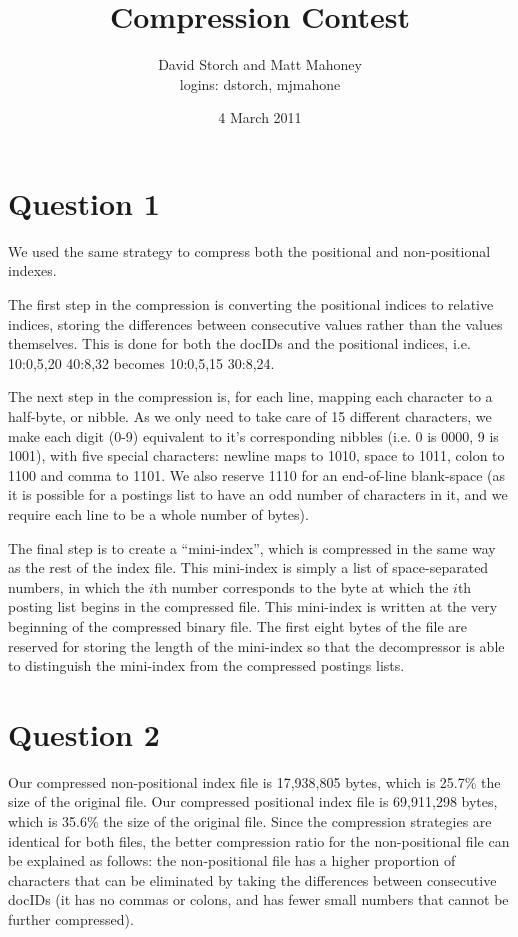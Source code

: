 \documentclass[11pt]{article}
\title{Compression Contest}
\author{David Storch and Matt Mahoney \\
	logins: dstorch, mjmahone}
\date{4 March 2011}
\begin{document}
\maketitle

\section{Question 1}

We used the same strategy to compress both the positional and non-positional indexes.

The first step in the compression is converting the positional indices to relative indices, storing
the differences between consecutive values rather than the values themselves.
This is done for both the docIDs and the positional indices, i.e. 10:0,5,20 40:8,32 becomes
10:0,5,15 30:8,24.

The next step in the compression is, for each line, mapping each character to a half-byte, or nibble. As we only need to
take care of 15 different characters, we make each digit (0-9) equivalent to it's corresponding nibbles
(i.e. 0 is 0000, 9 is  1001), with five special characters: newline maps to 1010, 
space to 1011, colon to 1100 and comma to 1101. 
We also reserve 1110 for an end-of-line blank-space (as it is possible for a postings list to have an odd number of characters in it, and we require each line to be a whole number of bytes).

The final step is to create a ``mini-index'', which is compressed in the same way as 
the rest of the index file. This mini-index is simply a list of space-separated numbers, in which the $i$th number corresponds
to the byte at which the $i$th posting list begins in the compressed file. This mini-index is written
at the very beginning of the compressed binary file. The first eight bytes of the file are reserved for storing
the length of the mini-index so that the decompressor is able to distinguish the mini-index from the compressed postings lists.

\section{Question 2}

Our compressed non-positional index file is 17,938,805 bytes, which is 25.7\% 
the size of the original file. Our compressed positional index file is
69,911,298 bytes, which is 35.6\% the size of the original file. Since the
compression strategies are identical for both files, the better compression
ratio for the non-positional file can be explained as follows: the non-positional
file has a higher proportion of characters that can be eliminated by taking the
differences between consecutive docIDs (it has no commas or colons, and has 
fewer small numbers that cannot be further compressed).
\end{document}
